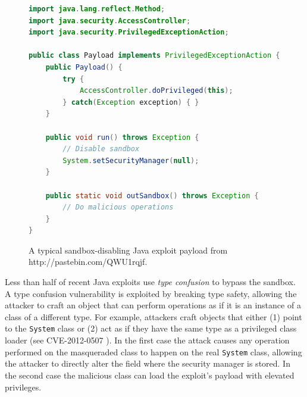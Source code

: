 \documentclass{sig-alternate}
\begin{document}
\begin{figure}
\begin{centering}
\begin{lstlisting}[language=Java,basicstyle={\scriptsize}]
import java.lang.reflect.Method; 
import java.security.AccessController; 
import java.security.PrivilegedExceptionAction;   

public class Payload implements PrivilegedExceptionAction {         
    public Payload() {
        try {
            AccessController.doPrivileged(this);
        } catch(Exception exception) { }     
    }

    public void run() throws Exception {
        // Disable sandbox
        System.setSecurityManager(null);
    }

    public static void outSandbox() throws Exception {
        // Do malicious operations
    }
}
\end{lstlisting}

\par\end{centering}

\caption{A typical sandbox-disabling Java exploit payload from http://pastebin.com/QWU1rqjf.}
\label{fig:A-typical-exploit-payload}
\end{figure}


Less than half of recent Java exploits use \textit{type confusion}
to bypass the sandbox. A type confusion vulnerability is exploited
by breaking type safety, allowing the attacker to craft an object
that can perform operations as if it is an instance of a class of
a different type. For example, attackers craft objects that either
(1) point to the \texttt{System} class or (2) act as if they have
the same type as a privileged class loader (see CVE-2012-0507 \cite{_vulnerability_2012_0507}).
In the first case the attack causes any operation performed on the
masqueraded class to happen on the real \texttt{System} class, allowing
the attacker to directly alter the field where the security manager
is stored. In the second case the malicious class can load the exploit's
payload with elevated privileges.
\end{document}
